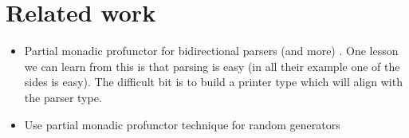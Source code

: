 \documentclass[sigplan,review,dvipsnames,screen,10pt]{acmart}
\begin{document}

\maketitle

\section{Related work}

\begin{itemize}
\item Partial monadic profunctor for bidirectional parsers (and more)
  \cite{monadic-profunctors}. One lesson we can learn from this is
  that parsing is easy (in all their example one of the sides is
  easy). The difficult bit is to build a printer type which will align
  with the parser type.
\item Use partial monadic profunctor technique for random generators \cite{reflect-random}
\end{itemize}


{}
\end{document}
